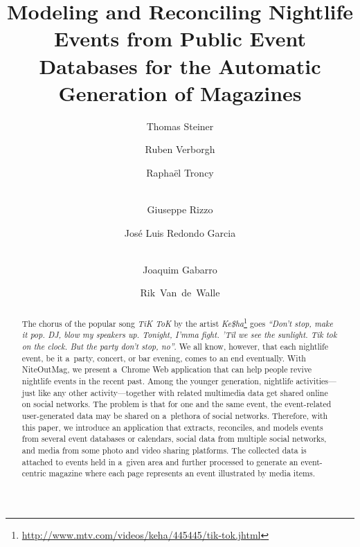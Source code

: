 \documentclass[runningheads,a4paper]{llncs}
\begin{document}
\title{Modeling and Reconciling Nightlife Events from Public Event Databases for the Automatic Generation of Magazines}

\author{Thomas Steiner \and
		Ruben Verborgh \and
        Rapha\"el Troncy \and\\
		Giuseppe Rizzo \and
		José Luis Redondo Garcia \and	\\
		Joaquim Gabarro \and
		Rik~Van~de~Walle		
}


\maketitle
\setcounter{footnote}{0}

\begin{abstract}
The chorus of the popular song \emph{TiK ToK} by the artist \emph{Ke\$ha}\footnote{\url{http://www.mtv.com/videos/keha/445445/tik-tok.jhtml}} goes \emph{``Don't stop, make it pop. DJ, blow my speakers up. Tonight, I'mma fight. 'Til we see the sunlight. Tik tok on the clock. But the party don't stop, no''}. We all know, however, that each nightlife event, be it a~party, concert, or bar evening, comes to an end eventually. With NiteOutMag, we present a~Chrome Web application that can help people revive nightlife events in the recent past. Among the younger generation, nightlife activities---just like any other activity---together with related multimedia data get shared online on social networks. The problem is that for one and the same event, the event-related user-generated data may be shared on a~plethora of social networks. Therefore, with this paper, we introduce an application that extracts, reconciles, and models events from several event databases or calendars, social data from multiple social networks, and media from some photo and video sharing platforms. The collected data is attached to events held in a~given area and further processed to generate an event-centric magazine where each page represents an event illustrated by media items.
\end{abstract}
\end{document}
